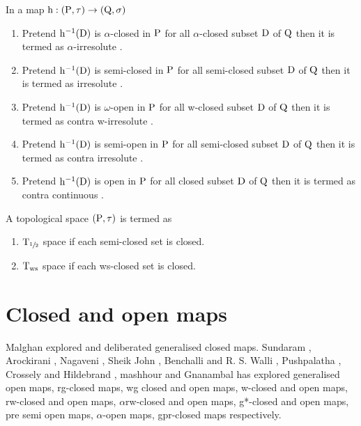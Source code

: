 \begin{dfn}\label{dfn1.3.2} 
In a map $\mathrm{h}: (\mathrm{P}, \tau) \rightarrow (\mathrm{Q}, \sigma)$
\begin{enumerate}
\item Pretend $\mathrm{h}^{-1}(\mathrm{D})$ is $\alpha$-closed in $\mathrm{P}$ for all $\alpha$-closed subset $\mathrm{D}$ of $\mathrm{Q}$ then it is termed as $\alpha$-irresolute \cite{Maki11}. 
\item Pretend $\mathrm{h}^{-1}(\mathrm{D})$ is semi-closed in $\mathrm{P}$ for all semi-closed subset $\mathrm{D}$ of $\mathrm{Q}$ then it is termed as irresolute \cite{Crossley}.
\item Pretend $\mathrm{h}^{-1}(\mathrm{D})$ is $\omega$-open in $\mathrm{P}$ for all w-closed subset $\mathrm{D}$ of $\mathrm{Q}$ then it is termed as contra w-irresolute \cite{Sheik1}. 
\item Pretend $\mathrm{h}^{-1}(\mathrm{D})$ is semi-open in $\mathrm{P}$ for all semi-closed subset $\mathrm{D}$ of $\mathrm{Q}$ then it is termed as contra irresolute \cite{Baker}. 
\item Pretend $\mathrm{h}^{-1}(\mathrm{D})$ is open in $\mathrm{P}$ for all closed subset $\mathrm{D}$ of $\mathrm{Q}$ then it is termed as contra continuous \cite{Dontchev1}. 
\end{enumerate}
\end{dfn}


\begin{dfn}\label{dfn1.3.3} 
A topological space $(\mathrm{P}, \tau)$ is termed as 
\begin{enumerate}[\rm (i)]
\item $\mathrm{T}_{\sfrac{1}{2}}$ space \cite{Malghan} if each semi-closed set is closed. 
\item $\mathrm{T}_{\text{ws}}$ space \cite{Basavaraj} if each ws-closed set is closed. 
\end{enumerate}
\end{dfn}

\section{Closed and open maps}

Malghan \cite{Malghan} explored and deliberated generalised closed maps. Sundaram \cite{Maki2}, Arockirani \cite{Arockiarani}, Nagaveni \cite{Nagaveni}, Sheik John \cite{Sheik1}, Benchalli \cite{Benchalli} and R. S. Walli \cite{Wali2}, Pushpalatha \cite{Pushpalatha}, Crossely and Hildebrand \cite{Crossely}, mashhour \cite{Abd1} and Gnanambal \cite{Gnanambal} has explored generalised open maps, rg-closed maps, wg closed and open maps, w-closed and open maps, rw-closed and open maps, $\alpha$rw-closed and open maps, g*-closed and open maps, pre semi open maps, $\alpha$-open maps, gpr-closed maps respectively.

